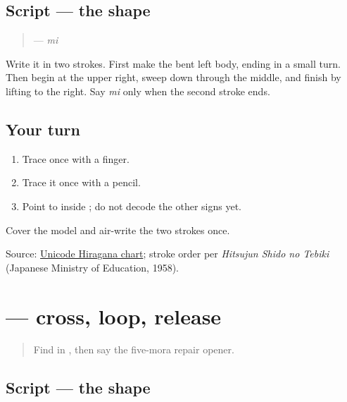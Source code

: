 \subsection*{Script — the shape}

\begin{quote}
\textbf{} — \emph{mi}
\end{quote}

Write it in two strokes. First make the bent left body, ending in a small turn. Then begin at the upper right, sweep down through the middle, and finish by lifting to the right. Say \emph{mi} only when the second stroke ends.

\subsection*{Your turn}
\begin{enumerate}
\raggedright
  \item Trace \textbf{} once with a finger.
  \item Trace it once with a pencil.
  \item Point to \textbf{} inside \textbf{}; do not decode the other signs yet.
\end{enumerate}

\begin{tcolorbox}[breakable,colback=teal!4,colframe=teal!35!black,title={Before you move on}]
Cover the model and air-write the two strokes once.

Source: \href{https://www.unicode.org/charts/PDF/U3040.pdf}{Unicode Hiragana chart}; stroke order per \emph{Hitsujun Shido no Tebiki} (Japanese Ministry of Education, 1958).
\end{tcolorbox}
\section[\texorpdfstring{\ja{め} (me)}{め (me)}]{ — cross, loop, release}

\label{lesson:JA-W09-me}



\begin{quote}
Find \textbf{} in \textbf{}, then say the five-mora repair opener.
\end{quote}

\subsection*{Script — the shape}

